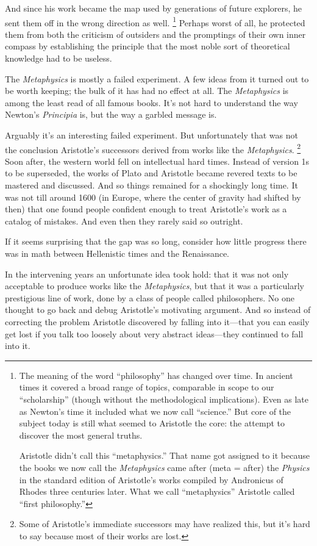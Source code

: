 \documentclass[12pt]{book}
\begin{document}
And since his work became the map used by generations of future
explorers, he sent them off in the wrong direction as well.
\footnote{The meaning of the word ``philosophy'' has changed over time. In
ancient times it covered a broad range of topics, comparable in scope to
our ``scholarship'' (though without the methodological implications).
Even as late as Newton's time it included what we now call ``science.''
But core of the subject today is still what seemed to Aristotle the
core: the attempt to discover the most general truths.

Aristotle didn't call this ``metaphysics.'' That name got assigned to it
because the books we now call the \emph{Metaphysics} came after (meta =
after) the \emph{Physics} in the standard edition of Aristotle's works
compiled by Andronicus of Rhodes three centuries later. What we call
``metaphysics'' Aristotle called ``first philosophy.''} Perhaps worst of all, he protected them from
both the criticism of outsiders and the promptings of their own inner
compass by establishing the principle that the most noble sort of
theoretical knowledge had to be useless.

The \emph{Metaphysics} is mostly a failed experiment. A few ideas from
it turned out to be worth keeping; the bulk of it has had no effect at
all. The \emph{Metaphysics} is among the least read of all famous books.
It's not hard to understand the way Newton's \emph{Principia} is, but
the way a garbled message is.

Arguably it's an interesting failed experiment. But unfortunately that
was not the conclusion Aristotle's successors derived from works like
the \emph{Metaphysics}. \footnote{Some of Aristotle's immediate successors may have realized this,
but it's hard to say because most of their works are lost.} Soon after, the western
world fell on intellectual hard times. Instead of version 1s to be
superseded, the works of Plato and Aristotle became revered texts to be
mastered and discussed. And so things remained for a shockingly long
time. It was not till around 1600 (in Europe, where the center of
gravity had shifted by then) that one found people confident enough to
treat Aristotle's work as a catalog of mistakes. And even then they
rarely said so outright.

If it seems surprising that the gap was so long, consider how little
progress there was in math between Hellenistic times and the
Renaissance.

In the intervening years an unfortunate idea took hold: that it was not
only acceptable to produce works like the \emph{Metaphysics}, but that
it was a particularly prestigious line of work, done by a class of
people called philosophers. No one thought to go back and debug
Aristotle's motivating argument. And so instead of correcting the
problem Aristotle discovered by falling into it---that you can easily
get lost if you talk too loosely about very abstract ideas---they
continued to fall into it.
\end{document}
